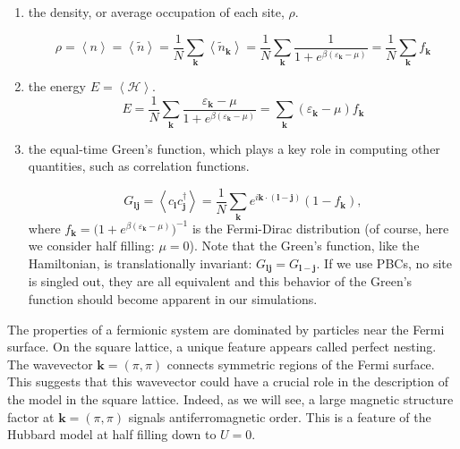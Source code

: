 \begin{enumerate}
\item the density, or average occupation of each site, $\rho$.

\begin{equation}
\rho = \left\langle n \right\rangle = \left\langle \tilde{n} \right\rangle = \frac{1}{N} \sum_{{\bm k}} \left\langle \tilde{n}_{\bm k} \right\rangle  = \frac{1}{N} \sum_{\bm k}  \frac{1}{1 + e^{\beta (\varepsilon_{\bm k} - \mu)}} = \frac{1}{N} \sum_{\bm k}  f_{\bm k}
\end{equation}

\item the energy $E = \left\langle \mathcal{H} \right\rangle$.
\begin{equation}
E = \frac{1}{N} \sum_{\bm k} \frac{\varepsilon_{\bm k} - \mu}{1 + e^{\beta(\varepsilon_{\bm k} - \mu)}} = \sum_{\bm k} (\varepsilon_{\bm k} - \mu) f_{\bm k}
\end{equation}

\item the equal-time Green's function, which plays a key role in computing other quantities, such as correlation functions.

\begin{equation}\label{eq:eqGreenNonInt}
G_{\bm l \bm j} = \left\langle c_{\bm l} c_{\bm j}^\dagger \right\rangle = \frac{1}{N} \sum_{\bm k} e^{ i {\bm k} \cdot ( \bm l -\bm  j ) } ( 1 - f_{\bm k} ),
\end{equation}
where $f_{\bm k} = \big(1 + e^{\beta(\varepsilon_{\bm k} - \mu)} \big)^{-1}$ is the Fermi-Dirac distribution (of course, here we consider half filling: $\mu = 0$).
Note that the Green's function, like the Hamiltonian, is translationally invariant: $G_{\bm l \bm j} = G_{\bm l-\bm j}$. 
If we use PBCs, no site is singled out, they are all equivalent and this behavior of the Green's function should become apparent in our simulations.
\end{enumerate}

The properties of a fermionic system are dominated by particles near the Fermi surface.
On the square lattice, a unique feature appears called perfect nesting. 
The wavevector $\bm k = (\pi , \pi)$ connects symmetric regions of the Fermi surface.
This suggests that this wavevector could have a crucial role in the description of the model in the square lattice.
Indeed, as we will see, a large magnetic structure factor at $\bm k = (\pi , \pi)$ signals antiferromagnetic order.
This is a feature of the Hubbard model at half filling down to $U = 0$.

